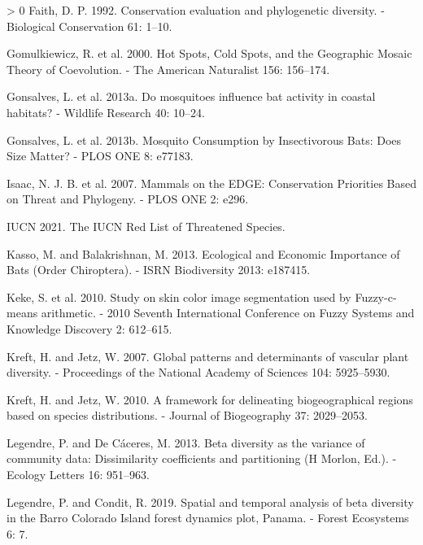 \documentclass[11pt]{article}
\newlength{\cslhangindent}
\newenvironment{CSLReferences}[3] %
 {%
  \setlength{\parindent}{0pt}
  \ifodd #1 \everypar{\setlength{\hangindent}{\cslhangindent}}\ignorespaces\fi
  \ifnum #2 > 0
  \setlength{\parskip}{#2\baselineskip}
  \fi
 }%
 {}
\begin{document}
\begin{CSLReferences}{1}{0}
\leavevmode\hypertarget{ref-Faith1992ConEva}{}%
Faith, D. P. 1992. Conservation evaluation and phylogenetic diversity. -
Biological Conservation 61: 1--10.

\leavevmode\hypertarget{ref-Gomulkiewicz2000HotSpo}{}%
Gomulkiewicz, R. et al. 2000. Hot Spots, Cold Spots, and the Geographic
Mosaic Theory of Coevolution. - The American Naturalist 156: 156--174.

\leavevmode\hypertarget{ref-Gonsalves2013MosInf}{}%
Gonsalves, L. et al. 2013a. Do mosquitoes influence bat activity in
coastal habitats? - Wildlife Research 40: 10--24.

\leavevmode\hypertarget{ref-Gonsalves2013MosCon}{}%
Gonsalves, L. et al. 2013b. Mosquito Consumption by Insectivorous Bats:
Does Size Matter? - PLOS ONE 8: e77183.

\leavevmode\hypertarget{ref-Isaac2007MamEdg}{}%
Isaac, N. J. B. et al. 2007. Mammals on the EDGE: Conservation
Priorities Based on Threat and Phylogeny. - PLOS ONE 2: e296.

\leavevmode\hypertarget{ref-IUCN2021IucRed}{}%
IUCN 2021. The IUCN Red List of Threatened Species.

\leavevmode\hypertarget{ref-Kasso2013EcoEco}{}%
Kasso, M. and Balakrishnan, M. 2013. Ecological and Economic Importance
of Bats (Order Chiroptera). - ISRN Biodiversity 2013: e187415.

\leavevmode\hypertarget{ref-Keke2010StuSki}{}%
Keke, S. et al. 2010. Study on skin color image segmentation used by
Fuzzy-c-means arithmetic. - 2010 Seventh International Conference on
Fuzzy Systems and Knowledge Discovery 2: 612--615.

\leavevmode\hypertarget{ref-Kreft2007GloPat}{}%
Kreft, H. and Jetz, W. 2007. Global patterns and determinants of
vascular plant diversity. - Proceedings of the National Academy of
Sciences 104: 5925--5930.

\leavevmode\hypertarget{ref-Kreft2010FraDel}{}%
Kreft, H. and Jetz, W. 2010. A framework for delineating biogeographical
regions based on species distributions. - Journal of Biogeography 37:
2029--2053.

\leavevmode\hypertarget{ref-Legendre2013BetDiv}{}%
Legendre, P. and De Cáceres, M. 2013. Beta diversity as the variance of
community data: Dissimilarity coefficients and partitioning (H Morlon,
Ed.). - Ecology Letters 16: 951--963.

\leavevmode\hypertarget{ref-Legendre2019SpaTem}{}%
Legendre, P. and Condit, R. 2019. Spatial and temporal analysis of beta
diversity in the Barro Colorado Island forest dynamics plot, Panama. -
Forest Ecosystems 6: 7.


\end{CSLReferences}
\end{document}
